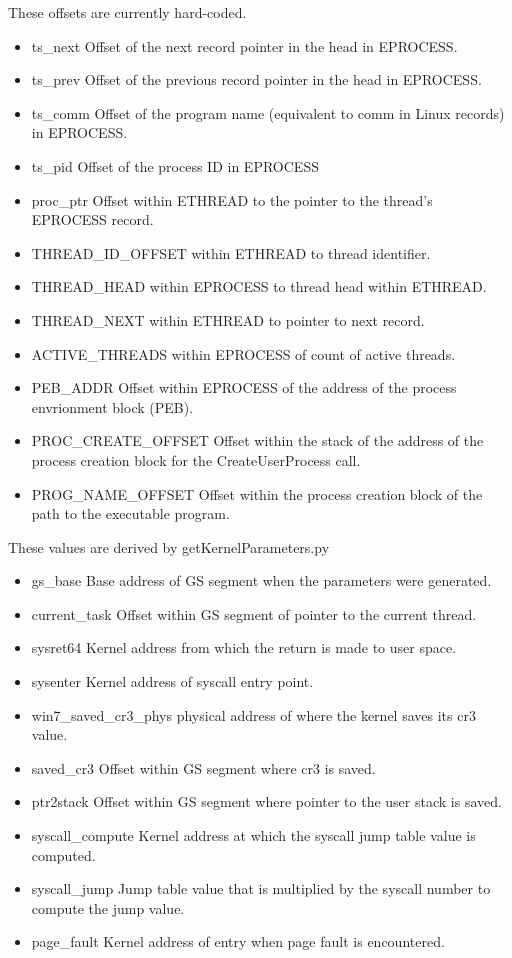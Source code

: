 \documentclass[titlepage]{article}
\begin{document}
\begin{appendices}
These offsets are currently hard-coded.
\begin{itemize}
\item ts\_next Offset of the next record pointer in the head in EPROCESS.
\item ts\_prev Offset of the previous record pointer in the head in EPROCESS.
\item ts\_comm Offset of the program name (equivalent to comm in Linux records) in EPROCESS.
\item ts\_pid Offset of the process ID in EPROCESS
\item proc\_ptr Offset within ETHREAD to the pointer to the thread's EPROCESS record.
\item THREAD\_ID\_OFFSET within ETHREAD to thread identifier.
\item THREAD\_HEAD within EPROCESS to thread head within ETHREAD.
\item THREAD\_NEXT within ETHREAD to pointer to next record.
\item ACTIVE\_THREADS within EPROCESS of count of active threads.
\item PEB\_ADDR Offset within EPROCESS of the address of the process envrionment block (PEB).
\item PROC\_CREATE\_OFFSET Offset within the stack of the address of the process creation block for the CreateUserProcess call.
\item PROG\_NAME\_OFFSET Offset within the process creation block of the path to the executable program.
\end{itemize}

These values are derived by getKernelParameters.py
\begin{itemize}
\item gs\_base Base address of GS segment when the parameters were generated.
\item current\_task Offset within GS segment of pointer to the current thread.
\item sysret64 Kernel address from which the return is made to user space.  
\item sysenter Kernel address of syscall entry point.
\item win7\_saved\_cr3\_phys physical address of where the kernel saves its cr3 value.
\item saved\_cr3 Offset within GS segment where cr3 is saved.
\item ptr2stack Offset within GS segment where pointer to the user stack is saved.
\item syscall\_compute Kernel address at which the syscall jump table value is computed.
\item syscall\_jump Jump table value that is multiplied by the syscall number to compute the jump value.
\item page\_fault Kernel address of entry when page fault is encountered.
\end{itemize}


\end{appendices}
\end{document}

